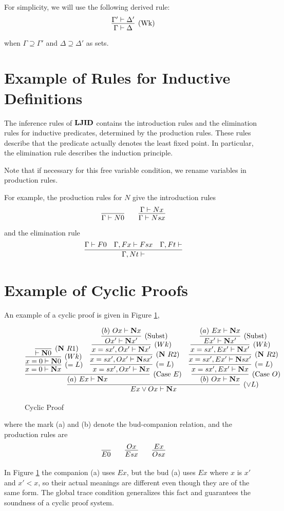For simplicity, we will use the following derived rule:
\[
\infer[(\Wk)]{\Gamma \prove \Delta}{\Gamma' \prove \Delta'}
\] 
when $\Gamma \supseteq \Gamma'$ and $\Delta \supseteq \Delta'$
as sets.

\section{Example of Rules for Inductive Definitions}

The inference rules of ${\bf LJID}$ contains
the introduction rules and the elimination rules for inductive predicates,
determined by the production rules.
These rules describe that the predicate actually denotes the least fixed point.
In particular, the elimination rule describes the induction principle.

Note that if necessary for this free variable condition, 
we rename variables in production rules.

For example, the production rules for $N$ give the introduction rules
\[
\infer{\Gamma \prove N0}{}
\qquad
\infer{\Gamma \prove Ns x}{\Gamma \prove Nx}
\]
and the elimination rule
\[
\infer{\Gamma,Nt \prove}{
\Gamma \prove F0
&
\Gamma,Fx \prove Fs x
&
\Gamma,Ft \prove
}
\]

\section{Example of Cyclic Proofs}

\begin{Eg}\label{eg:1}\rm
An example of a cyclic proof is given in Figure \ref{fig:5},
\begin{figure}[t]
\[
\infer[(\lor L)]{Ex \lor Ox \prove \N x}{
	\infer[(\Case\ E)]{(a)\ Ex \prove \N x}{
		\infer[(=L)]{x=0 \prove \N x}{
		\infer[(Wk)]{x=0 \prove \N 0}{
		\infer[(\N\ R1)]{\prove \N 0}{}
		}}
		&
		\infer[(=L)]{x=sx',Ox' \prove \N x}{
		\infer[(\N\ R2)]{x=sx',Ox' \prove \N sx'}{
		\infer[(Wk)]{x=sx',Ox' \prove \N x'}{
		\infer[(\Subst)]{Ox' \prove \N x'}{
		(b)\ Ox \prove \N x
		}}}}
	}
	&
	\infer[(\Case\ O)]{(b)\ Ox \prove \N x}{
	\infer[(=L)]{x=sx',Ex' \prove \N x}{
	\infer[(\N\ R2)]{x=sx',Ex' \prove \N sx'}{
	\infer[(Wk)]{x=sx',Ex' \prove \N x'}{
	\infer[(\Subst)]{Ex' \prove \N x'}{
	(a)\ Ex \prove \N x
	}}}}}
}
\]
\caption{Cyclic Proof}\label{fig:5}
\end{figure}
where the mark (a) and (b) denote the bud-companion relation, and
the production rules are
\[
\infer{E0}{}
\qquad
\infer{Esx}{Ox}
\qquad
\infer{Osx}{Ex}
\]
\end{Eg}
In Figure \ref{fig:5} the companion (a) uses $E x$, but
the bud (a) uses $E x$ where $x$ is $x'$ and $x' < x$,
so 
their actual meanings are different
even though they are of the same form.
The global trace condition generalizes this fact
and guarantees the soundness of a cyclic proof system.

